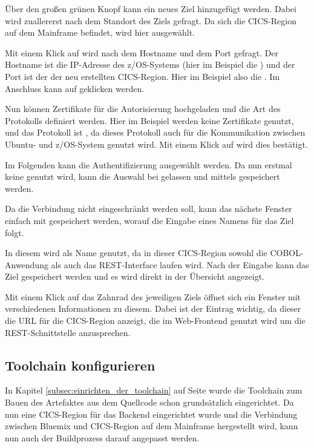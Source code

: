 Über den großen grünen Knopf kann ein neues Ziel hinzugefügt werden. Dabei wird zuallererst nach dem Standort des Ziels
gefragt. Da sich die CICS-Region auf dem Mainframe befindet, wird hier  ausgewählt.

Mit einem Klick auf  wird nach dem Hostname und dem Port gefragt. Der Hostname ist die IP-Adresse des z/OS-Systems
(hier im Beispiel die ) und der Port ist der der neu erstellten CICS-Region. Hier im Beispiel also die
. Im Anschluss kann auf  geklicken werden.

Nun können Zertifikate für die Autorisierung hochgeladen und die Art des Protokolls definiert werden. Hier im Beispiel
werden keine Zertifikate genutzt, und das Protokoll ist , da dieses Protokoll auch für die Kommunikation zwischen
Ubuntu- und z/OS-System genutzt wird. Mit einem Klick auf  wird dies bestätigt.

Im Folgenden kann die Authentifizierung ausgewählt werden. Da nun erstmal keine genutzt wird, kann die Auswahl bei
 gelassen und mittels  gespeichert werden.

Da die Verbindung nicht eingeschränkt werden soll, kann das nächste Fenster einfach mit  gespeichert werden,
worauf die Eingabe eines Namens für das Ziel folgt.

In diesem wird als Name  genutzt, da in dieser CICS-Region sowohl die COBOL-Anwendung als auch das
REST-Interface laufen wird. Nach der Eingabe kann das Ziel gespeichert werden und es wird direkt in der Übersicht angezeigt.

Mit einem Klick auf das Zahnrad des jeweiligen Ziels öffnet sich ein Fenster mit verschiedenen Informationen zu diesem.
Dabei ist der Eintrag  wichtig, da dieser die URL für die CICS-Region anzeigt, die im Web-Frontend
genutzt wird um die REST-Schnittstelle anzusprechen.

\subsection{Toolchain konfigurieren}
In Kapitel \ref{subsec:einrichten_der_toolchain} auf Seite \pageref{subsec:einrichten_der_toolchain} wurde die Toolchain
zum Bauen des Artefaktes aus dem Quellcode schon grundsätzlich eingerichtet. Da nun eine CICS-Region für das Backend
eingerichtet wurde und die Verbindung zwischen Bluemix und CICS-Region auf dem Mainframe hergestellt wird, kann nun auch
der Buildprozess darauf angepasst werden.


